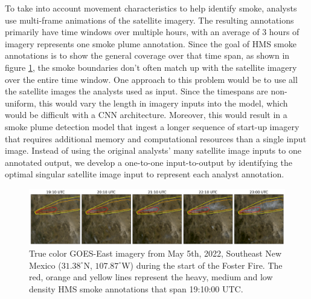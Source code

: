 \documentclass{article}
\begin{document}
To take into account movement characteristics to help identify smoke, analysts use multi-frame animations of the satellite imagery. The resulting annotations primarily have time windows over multiple hours, with an average of 3 hours of imagery represents one smoke plume annotation. Since the goal of HMS smoke annotations is to show the general coverage over that time span, as shown in figure \ref{timelapse}, the smoke boundaries don't often match up with the satellite imagery over the entire time window. One approach to this problem would be to use all the satellite images the analysts used as input. Since the timespans are non-uniform, this would vary the length in imagery inputs into the model, which would be difficult with a CNN architecture. Moreover, this would result in a smoke plume detection model that ingest a longer sequence of start-up imagery that requires additional memory and computational resources than a single input image. Instead of using the original analysts' many satellite image inputs to one annotated output, we develop a one-to-one input-to-output by identifying the optimal singular satellite image input to represent each analyst annotation. 

\begin{figure}[!htb]
    \centering
    \includegraphics[width=\linewidth]{figures/TIMELAPSE_FINAL2.png}
    \caption{True color GOES-East imagery from May 5th, 2022, Southeast New Mexico (\(31.38^{\circ}\)N, \(107.87^{\circ}\)W) during the start of the Foster Fire. The red, orange and yellow lines represent the heavy, medium and low density HMS smoke annotations that span 19:10:00 UTC.}
    \label{timelapse}
\end{figure}
\end{document}
